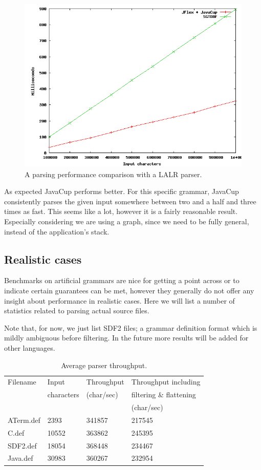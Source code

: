 \documentclass[a4paper,10pt]{article}
\begin{document}
\begin{figure}[H]
\centering
\includegraphics[scale=0.4]{vsLALR.png}
\caption{A parsing performance comparison with a LALR parser.}
\end{figure}

As expected JavaCup performs better. For this specific grammar, JavaCup consistently parses the given input somewhere between two and a half and three times as fast. This seems like a lot, however it is a fairly reasonable result. Especially considering we are using a graph, since we need to be fully general, instead of the application's stack.

\subsection{Realistic cases}

Benchmarks on artificial grammars are nice for getting a point across or to indicate certain guarantees can be met, however they generally do not offer any insight about performance in realistic cases. Here we will list a number of statistics related to parsing actual source files.

Note that, for now, we just list SDF2 files; a grammar definition format which is mildly ambiguous before filtering. In the future more results will be added for other languages.

\begin{table}[H]
\centering
\begin{tabular}{ | p{5em} | p{5em} | p{6em} | p{10em} |}
  \hline
  Filename & Input & Throughput & Throughput including\\
   & characters & (char/sec) & filtering \& flattening\\
   & & & (char/sec)\\
  \hline
  ATerm.def & 2393 & 341857 & 217545\\
  C.def & 10552 & 363862 & 245395\\
  SDF2.def & 18054 & 368448 & 234467\\
  Java.def & 30983 & 360267 & 232954\\
  \hline
\end{tabular}
\caption{Average parser throughput.}
\end{table}
\end{document}
